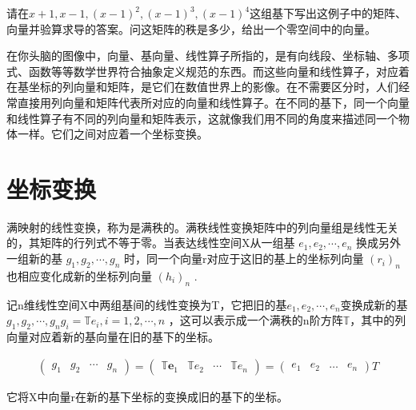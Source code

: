 请在$ x+1, x-1, (x-1)^2,(x-1)^3,(x-1)^4 $这组基下写出这例子中的矩阵、向量并验算求导的答案。问这矩阵的秩是多少，给出一个零空间中的向量。

\songti

在你头脑的图像中，向量、基向量、线性算子所指的，是有向线段、坐标轴、多项式、函数等等数学世界符合抽象定义规范的东西。而这些向量和线性算子，对应着在基坐标的列向量和矩阵，是它们在数值世界上的影像。在不需要区分时，人们经常直接用列向量和矩阵代表所对应的向量和线性算子。在不同的基下，同一个向量和线性算子有不同的列向量和矩阵表示，这就像我们用不同的角度来描述同一个物体一样。它们之间对应着一个坐标变换。

\section{坐标变换}

满映射的线性变换，称为是满秩的。满秩线性变换矩阵中的列向量组是线性无关的，其矩阵的行列式不等于零。当表达线性空间X从一组基 $ {e_1,e_2,\cdots,e_n} $ 换成另外一组新的基 $ {g_1,g_2,\cdots,g_n} $ 时，同一个向量r对应于这旧的基上的坐标列向量 $ (r_i)_n $ 也相应变化成新的坐标列向量 $ (h_i)_n $ . 

记n维线性空间X中两组基间的线性变换为T，它把旧的基$ {e_1,e_2,\cdots,e_n} $变换成新的基$ {g_1,g_2,\cdots,g_n} g_i = \mathbb{T}e_i, i=1,2,\cdots,n$ ，这可以表示成一个满秩的n阶方阵$ \mathbb{T} $，其中的列向量对应着新的基向量在旧的基下的坐标。

\begin{gather*}
	\begin{pmatrix}{g}_1& {g}_2& \cdots & {g}_n \end{pmatrix} = \begin{pmatrix} \mathbb{T}\textbf{e}_1& \mathbb{T}{e}_2& \cdots & \mathbb{T}{e}_n \end{pmatrix} =\begin{pmatrix} {e_1} &{e_2}  &\dots  & {e_n}\end{pmatrix}T
\end{gather*}

它将X中向量r在新的基下坐标的变换成旧的基下的坐标。

